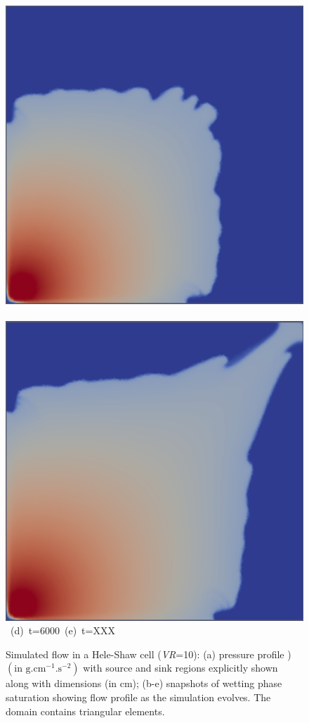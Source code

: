 \begin{landscape}
\begin{figure}[ht]
{\vspace{0.5cm}
\hbox{
      \includegraphics[width=.5\textwidth]{./Pics1/Saffman_homogeneous/saffman_homo_fixed_6000.pdf}
      \includegraphics[width=.5\textwidth]{./Pics1/Saffman_homogeneous/saffman_homo_fixed_end_1.pdf}}
\vspace{0.cm}
\hbox{ \hspace{2.cm} (d) t=6000 \hspace{4.cm} (e) t=XXX}
\vspace{0.cm}
}   
\caption{Simulated flow in a Hele-Shaw cell ({\it VR}=10): (a) pressure profile ) $\left(\text{in g.cm}^{-1}\text{.s}^{-2}\right)$ with source and sink regions explicitly shown along with dimensions (in cm); (b-e) snapshots of wetting phase saturation showing flow profile as the simulation evolves. The domain contains   triangular elements. }
\label{fig:homoheleshaw_VN10}
\end{figure}
\end{landscape}
\clearpage



